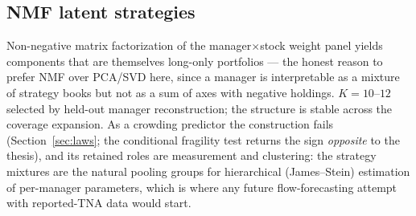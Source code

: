 \subsection{NMF latent strategies}

Non-negative matrix factorization of the manager$\times$stock weight
panel yields components that are themselves long-only portfolios ---
the honest reason to prefer NMF over PCA/SVD here, since a manager is
interpretable as a mixture of strategy books but not as a sum of
axes with negative holdings. $K=10$--$12$ selected by held-out
manager reconstruction; the structure is stable across the coverage
expansion. As a crowding predictor the construction fails
(Section~\ref{sec:laws}; the conditional fragility test returns the
sign \emph{opposite} to the \citet{greenwood2011} thesis), and its
retained roles are measurement and clustering: the strategy mixtures
are the natural pooling groups for hierarchical (James--Stein)
estimation of per-manager parameters, which is where any future
flow-forecasting attempt with reported-TNA data would start.

